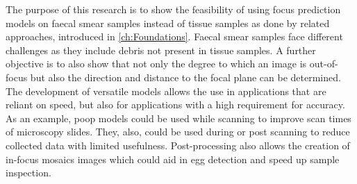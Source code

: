 The purpose of this research is to show the feasibility of using focus prediction models on faecal smear samples instead of tissue samples as done by related approaches, introduced in \autoref{ch:Foundations}. Faecal smear samples face different challenges as they include debris not present in tissue samples.
A further objective is to also show that not only the degree to which an image is out-of-focus but also the direction and distance to the focal plane can be determined. The development of versatile models allows the use in applications that are reliant on speed, but also for applications with a high requirement for accuracy. As an example, \ac{poop} models could be used while scanning to improve scan times of microscopy slides. They, also, could be used during or post scanning to reduce collected data with limited usefulness. Post-processing also allows the creation of in-focus mosaics images which could aid in egg detection and speed up sample inspection.
